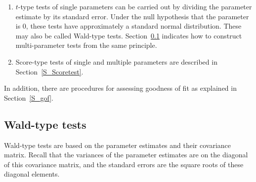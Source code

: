 \documentclass[a4paper,fleqn,11pt]{article}
\newcommand{\+}{\, + \,}
\begin{document}
\begin{enumerate}
\item $t$-type tests of single parameters can be carried out by
dividing the parameter estimate by its standard error.
Under the null hypothesis that the parameter is 0,
these tests have approximately a standard normal distribution.
These may also be called Wald-type tests.
Section~\ref{Waldtest} indicates how to construct multi-parameter tests
from the same principle.

\item Score-type tests of single and multiple parameters
      are described in Section~\ref{S_Scoretest}.

\end{enumerate}
In addition, there are procedures for assessing goodness of fit
as explained in Section~\ref{S_gof}.

\subsection{Wald-type tests}
\label{Waldtest}

Wald-type tests are based on the parameter estimates
and their covariance matrix.
Recall that the variances of the parameter estimates
are on the diagonal of this covariance matrix, and
the standard errors are the square roots of these diagonal
elements.
\end{document}
